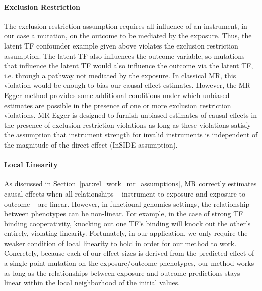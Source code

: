 \paragraph{Exclusion Restriction}
The exclusion restriction assumption requires all influence of an instrument, in our case a mutation, on the outcome to be mediated by the exposure. Thus, the latent TF confounder example given above violates the exclusion restriction assumption. The latent TF also influences the outcome variable, so mutations that influence the latent TF would also influence the outcome via the latent TF, i.e. through a pathway not mediated by the exposure. In classical MR, this violation would be enough to bias our causal effect estimates. However, the MR Egger method provides some additional conditions under which unbiased estimates are possible in the presence of one or more exclusion restriction violations. MR Egger is designed to furnish unbiased estimates of causal effects in the presence of exclusion-restriction violations as long as these violations satisfy the assumption that instrument strength for invalid instruments is independent of the magnitude of the direct effect (InSIDE assumption).

\paragraph{Local Linearity}%
\label{par:meth_local_linearity}
As discussed in Section~\ref{par:rel_work_mr_assumptions}, MR correctly estimates causal effects when all relationships -- instrument to exposure and exposure to outcome -- are linear. However, in functional genomics settings, the relationship between phenotypes can be non-linear. For example, in the case of strong TF binding cooperativity, knocking out one TF's binding will knock out the other's entirely, violating linearity. Fortunately, in our application, we only require the weaker condition of local linearity to hold in order for our method to work. Concretely, because each of our effect sizes is derived from the predicted effect of a single point mutation on the exposure/outcome phenotypes, our method works as long as the relationships between exposure and outcome predictions stays linear within the local neighborhood of the initial values.
